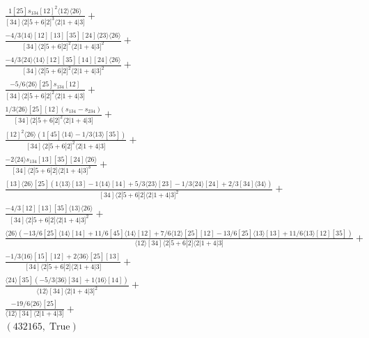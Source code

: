 \documentclass[varwidth, border=5pt]{standalone}
\begin{document}
\begin{my}
$\begin{gathered}
\scriptscriptstyle\frac{1[25]s_{134}[12]^2⟨12⟩⟨26⟩}{[34]⟨2|5+6|2]^3⟨2|1+4|3]}+\\
\scriptscriptstyle\frac{-4/3⟨14⟩[12][13][35][24]⟨23⟩⟨26⟩}{[34]⟨2|5+6|2]^2⟨2|1+4|3]^2}+\\
\scriptscriptstyle\frac{-4/3⟨24⟩⟨14⟩[12][35][14][24]⟨26⟩}{[34]⟨2|5+6|2]^2⟨2|1+4|3]^2}+\\
\scriptscriptstyle\frac{-5/6⟨26⟩[25]s_{134}[12]}{[34]⟨2|5+6|2]^2⟨2|1+4|3]}+\\
\scriptscriptstyle\frac{1/3⟨26⟩[25][12](s_{134}-s_{234})}{[34]⟨2|5+6|2]^2⟨2|1+4|3]}+\\
\scriptscriptstyle\frac{[12]^2⟨26⟩(1[45]⟨14⟩-1/3⟨13⟩[35])}{[34]⟨2|5+6|2]^2⟨2|1+4|3]}+\\
\scriptscriptstyle\frac{-2⟨24⟩s_{134}[13][35][24]⟨26⟩}{[34]⟨2|5+6|2]⟨2|1+4|3]^3}+\\
\scriptscriptstyle\frac{[13]⟨26⟩[25](1⟨13⟩[13]-1⟨14⟩[14]+5/3⟨23⟩[23]-1/3⟨24⟩[24]+2/3[34]⟨34⟩)}{[34]⟨2|5+6|2]⟨2|1+4|3]^2}+\\
\scriptscriptstyle\frac{-4/3[12][13][35]⟨13⟩⟨26⟩}{[34]⟨2|5+6|2]⟨2|1+4|3]^2}+\\
\scriptscriptstyle\frac{⟨26⟩(-13/6[25]⟨14⟩[14]+11/6[45]⟨14⟩[12]+7/6⟨12⟩[25][12]-13/6[25]⟨13⟩[13]+11/6⟨13⟩[12][35])}{⟨12⟩[34]⟨2|5+6|2]⟨2|1+4|3]}+\\
\scriptscriptstyle\frac{-1/3⟨16⟩[15][12]+2⟨36⟩[25][13]}{[34]⟨2|5+6|2]⟨2|1+4|3]}+\\
\scriptscriptstyle\frac{⟨24⟩[35](-5/3⟨36⟩[34]+1⟨16⟩[14])}{⟨12⟩[34]⟨2|1+4|3]^2}+\\
\scriptscriptstyle\frac{-19/6⟨26⟩[25]}{⟨12⟩[34]⟨2|1+4|3]}+\\
\scriptscriptstyle(432165,\;\text{True})\phantom{+}
\end{gathered}$
\end{my}
\end{document}
